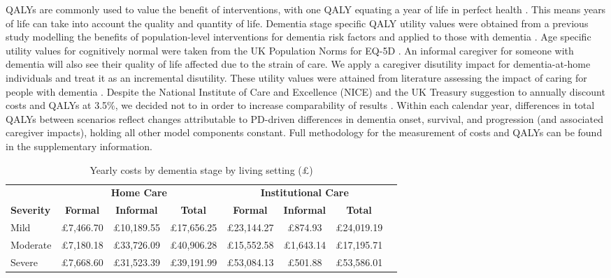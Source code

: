 \documentclass[11pt,a4paper]{article}
\begin{document}
QALYs are commonly used to value the benefit of interventions, with one QALY equating a year of life in perfect health \cite{ref36}. This means years of life can take into account the quality and quantity of life. Dementia stage specific QALY utility values were obtained from a previous study modelling the benefits of population-level interventions for dementia risk factors and applied to those with dementia \cite{ref37}. Age specific utility values for cognitively normal were taken from the UK Population Norms for EQ-5D \cite{ref38}. An informal caregiver for someone with dementia will also see their quality of life affected due to the strain of care. We apply a caregiver disutility impact for dementia-at-home individuals and treat it as an incremental disutility. These utility values were attained from literature assessing the impact of caring for people with dementia \cite{ref39}. Despite the National Institute of Care and Excellence (NICE) and the UK Treasury suggestion to annually discount costs and QALYs at 3.5\%, we decided not to in order to increase comparability of results \cite{ref40}. Within each calendar year, differences in total QALYs between scenarios reflect changes attributable to PD-driven differences in dementia onset, survival, and progression (and associated caregiver impacts), holding all other model components constant. Full methodology for the measurement of costs and QALYs can be found in the supplementary information.

\begin{table}[htbp]
\centering
\caption{Yearly costs by dementia stage by living setting (\pounds)}
\label{tab:costs}
\small
\begin{tabular}{lccccccc}
\toprule
& \multicolumn{3}{c}{\textbf{Home Care}} & \multicolumn{3}{c}{\textbf{Institutional Care}} \\
\cmidrule(lr){2-4} \cmidrule(lr){5-7}
\textbf{Severity} & \textbf{Formal} & \textbf{Informal} & \textbf{Total} & \textbf{Formal} & \textbf{Informal} & \textbf{Total} \\
\midrule
Mild & \pounds7,466.70 & \pounds10,189.55 & \pounds17,656.25 & \pounds23,144.27 & \pounds874.93 & \pounds24,019.19 \\
Moderate & \pounds7,180.18 & \pounds33,726.09 & \pounds40,906.28 & \pounds15,552.58 & \pounds1,643.14 & \pounds17,195.71 \\
Severe & \pounds7,668.60 & \pounds31,523.39 & \pounds39,191.99 & \pounds53,084.13 & \pounds501.88 & \pounds53,586.01 \\
\bottomrule
\end{tabular}
\end{table}
\end{document}
